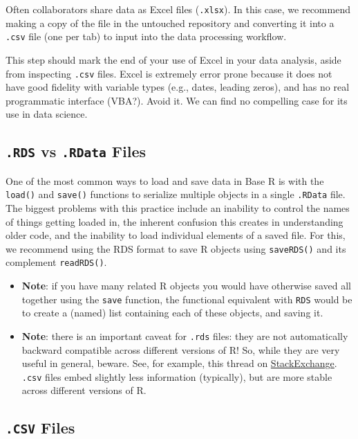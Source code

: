 \documentclass[
]{book}
\begin{document}
Often collaborators share data as Excel files (\texttt{.xlsx}). In this case, we recommend making a copy of the file in the untouched repository and converting it into a \texttt{.csv} file (one per tab) to input into the data processing workflow.

This step should mark the end of your use of Excel in your data analysis, aside from inspecting \texttt{.csv} files. Excel is extremely error prone because it does not have good fidelity with variable types (e.g., dates, leading zeros), and has no real programmatic interface (VBA?). Avoid it. We can find no compelling case for its use in data science.

\subsection{\texorpdfstring{\texttt{.RDS} vs \texttt{.RData} Files}{.RDS vs .RData Files}}\label{rds-vs-.rdata-files}

One of the most common ways to load and save data in Base R is with the \texttt{load()} and \texttt{save()} functions to serialize multiple objects in a single \texttt{.RData} file. The biggest problems with this practice include an inability to control the names of things getting loaded in, the inherent confusion this creates in understanding older code, and the inability to load individual elements of a saved file. For this, we recommend using the RDS format to save R objects using \texttt{saveRDS()} and its complement \texttt{readRDS()}.

\begin{itemize}
\item
  \textbf{Note}: if you have many related R objects you would have otherwise saved all together using the \texttt{save} function, the functional equivalent with \texttt{RDS} would be to create a (named) list containing each of these objects, and saving it.
\item
  \textbf{Note}: there is an important caveat for \texttt{.rds} files: they are not automatically backward compatible across different versions of R! So, while they are very useful in general, beware. See, for example, this thread on \href{https://stackoverflow.com/questions/56704638/write-a-file-using-saverds-so-that-it-is-backwards-compatible-with-old-versi}{StackExchange}. \texttt{.csv} files embed slightly less information (typically), but are more stable across different versions of R.
\end{itemize}

\subsection{\texorpdfstring{\texttt{.CSV} Files}{.CSV Files}}\label{csv-files}
\end{document}
